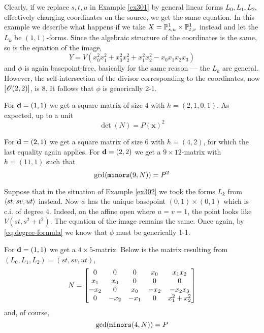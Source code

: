 \documentclass[fleqn,reqno]{amsart}
\begin{document}
\begin{example}[$\mt{ex302}$]
\label{ex302}
Clearly, if we replace $s,t,u$ in Example \ref{ex301} by general linear forms $L_0,L_1,L_2$,
effectively changing coordinates on the source, we get the same equation.
In this example we describe what happens if we take $X=\mathbb{P}^1_{s,u}\times\mathbb{P}^1_{t,v}$ instead
and let the $L_k$ be $(1,1)$-forms.
Since the algebraic structure of the coordinates is the same, so is the equation of the image,
\[
	Y=V({x}_{0}^{2} {x}_{1}^{2}+{x}_{0}^{2} {x}_{2}^{2}+{x}_{1}^{2}
	{x}_{2}^{2}-{x}_{0} {x}_{1} {x}_{2} {x}_{3})
\]
and $\phi$ is again basepoint-free, basically for the same reason ---
the $L_k$ are general.
However, the self-intersection of the divisor corresponding to the coordinates,
now $[\mathscr{O}(2,2)]$, is $8$.
It follows that $\phi$ is generically 2-1.

For $\mathbf d=(1,1)$ we get a square matrix of size $4$ with $h=(2,1,0,1)$.
As expected, up to a unit
\[
	\det(N)=P(\mathbf x)^2
\]

For $\mathbf d=(2,1)$ we get a square matrix of size $6$ with $h=(4,2)$, for which the
last equality again applies.
For $\mathbf d=(2,2)$ we get a $9\times12$-matrix with $h=(11,1)$ such that
\[
	\gcd(\mathop{\tt minors}(9,N))=P^2
\]
\end{example}

\begin{example}[$\mt{ex303}$]
\label{ex303}
Suppose that in the situation of Example \ref{ex302} we took the forms $L_k$ from
$\langle st,sv,ut\rangle$ instead.
Now $\phi$ has the unique basepoint $(0,1)\times(0,1)$ which is c.i. of degree $4$.
Indeed, on the affine open where $u=v=1$, the point looks like $V(st,s^2+t^2)$.
The equation of the image remains the same.
Once again, by \eqref{eq:degree-formula} we know that $\phi$ must be generically 1-1.

For $\mathbf d=(1,1)$ we get a $4\times5$-matrix.
Below is the matrix resulting from $(L_0,L_1,L_2)=(st,sv,ut)$,
\[
	N=
	\bgroup\begin{bmatrix}0&
      0&
      0&
      {x}_{0}&
      {x}_{1} {x}_{2}\\
      {x}_{1}&
      {x}_{0}&
      0&
      0&
      0\\
      {-{x}_{2}}&
      0&
      {x}_{0}&
      {-{x}_{2}}&
      {-{x}_{2} {x}_{3}}\\
      0&
      {-{x}_{2}}&
      {-{x}_{1}}&
      0&
      {x}_{1}^{2}+{x}_{2}^{2}\\
      \end{bmatrix}\egroup
\]
and, of course,
\[
	\gcd(\mathop{\tt minors}(4,N))=P
\]
\end{example}
\end{document}
